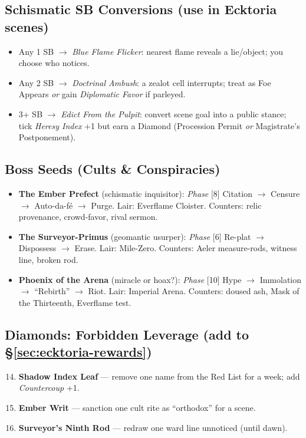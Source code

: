 \subsection*{Schismatic SB Conversions (use in Ecktoria scenes)}
\begin{itemize}
  \item Any 1 SB $\rightarrow$ \emph{Blue Flame Flicker}: nearest flame reveals a lie/object; you choose who notices.
  \item Any 2 SB $\rightarrow$ \emph{Doctrinal Ambush}: a zealot cell interrupts; treat as Foe Appears \emph{or} gain \emph{Diplomatic Favor} if parleyed.
  \item 3+ SB $\rightarrow$ \emph{Edict From the Pulpit}: convert scene goal into a public stance; tick \emph{Heresy Index} +1 but earn a Diamond (Procession Permit \emph{or} Magistrate’s Postponement).
\end{itemize}

\subsection*{Boss Seeds (Cults \& Conspiracies)}
\begin{itemize}
  \item \textbf{The Ember Prefect} (schismatic inquisitor): \emph{Phase} [8] Citation $\rightarrow$ Censure $\rightarrow$ Auto-da-fé $\rightarrow$ Purge. Lair: Everflame Cloister. Counters: relic provenance, crowd-favor, rival sermon.
  \item \textbf{The Surveyor-Primus} (geomantic usurper): \emph{Phase} [6] Re-plat $\rightarrow$ Dispossess $\rightarrow$ Erase. Lair: Mile-Zero. Counters: Aeler measure-rods, witness line, broken rod.
  \item \textbf{Phoenix of the Arena} (miracle or hoax?): \emph{Phase} [10] Hype $\rightarrow$ Immolation $\rightarrow$ ``Rebirth'' $\rightarrow$ Riot. Lair: Imperial Arena. Counters: doused ash, Mask of the Thirteenth, Everflame test.
\end{itemize}

\subsection*{Diamonds: Forbidden Leverage (add to \S\ref{sec:ecktoria-rewards})}
\begin{enumerate}
\setcounter{enumi}{13}
  \item \textbf{Shadow Index Leaf} --- remove one name from the Red List for a week; add \emph{Countercoup} +1.
  \item \textbf{Ember Writ} --- sanction one cult rite as ``orthodox'' for a scene.
  \item \textbf{Surveyor’s Ninth Rod} --- redraw one ward line unnoticed (until dawn).
\end{enumerate}


